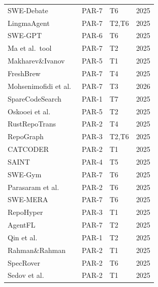 \begin{longtable}{p{5cm}p{1.2cm}p{1.5cm}r}
SWE-Debate~\cite{li2025swebdebate}               & PAR-7 & T6       & 2025 \\
LingmaAgent~\cite{ma2025lingma}                   & PAR-7 & T2,T6    & 2025 \\
SWE-GPT~\cite{ma2025swegpt}                      & PAR-6 & T6       & 2025 \\
Ma et al.\ tool~\cite{ma2025tool}                 & PAR-7 & T2       & 2025 \\
Makharev\&Ivanov~\cite{makharev2025code}           & PAR-5 & T1       & 2025 \\
FreshBrew~\cite{may2025freshbrew}                 & PAR-7 & T4       & 2025 \\
Mohsenimofidi et al.~\cite{mohsenimofidi2026context}& PAR-7 & T3     & 2026 \\
SpareCodeSearch~\cite{nguyen2025sparecodesearch}   & PAR-1 & T7       & 2025 \\
Oskooei et al.~\cite{oskooei2025natural}           & PAR-5 & T2       & 2025 \\
RustRepoTrans~\cite{ou2025rustrepo}               & PAR-2 & T4       & 2025 \\
RepoGraph~\cite{ouyang2025repograph}              & PAR-3 & T2,T6    & 2025 \\
CATCODER~\cite{pan2025catcoder}                   & PAR-2 & T1       & 2025 \\
SAINT~\cite{pan2025saint}                         & PAR-4 & T5       & 2025 \\
SWE-Gym~\cite{pan2025training}                    & PAR-7 & T6       & 2025 \\
Parasaram et al.~\cite{parasaram2025fact}          & PAR-2 & T6       & 2025 \\
SWE-MERA~\cite{pavel2025swemera}                  & PAR-7 & T6       & 2025 \\
RepoHyper~\cite{phan2025repohyper}               & PAR-3 & T1       & 2025 \\
AgentFL~\cite{qin2025agentfl}                    & PAR-7 & T2       & 2025 \\
Qin et al.~\cite{qin2025fault}                   & PAR-1 & T2       & 2025 \\
Rahman\&Rahman~\cite{rahman2025relative}           & PAR-2 & T1       & 2025 \\
SpecRover~\cite{ruan2025specrover}               & PAR-2 & T6       & 2025 \\
Sedov et al.~\cite{sedov2025importance}           & PAR-2 & T1       & 2025 \\

\end{longtable}
